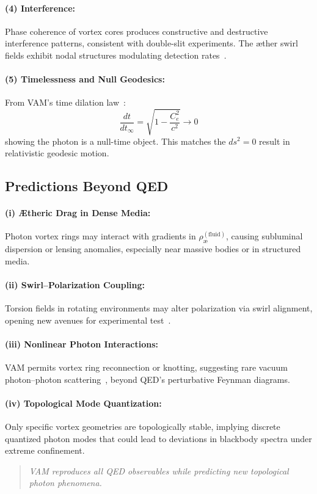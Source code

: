 \paragraph{(4) Interference:}
Phase coherence of vortex cores produces constructive and destructive interference patterns, consistent with double-slit experiments. The æther swirl fields exhibit nodal structures modulating detection rates~\cite{iskandarani2025c}.

\paragraph{(5) Timelessness and Null Geodesics:}
From VAM’s time dilation law~\cite{iskandarani2025b}:
\begin{equation}
    \frac{dt}{dt_\infty} = \sqrt{1 - \frac{C_e^2}{c^2}} \to 0
\end{equation}
showing the photon is a null-time object. This matches the $ds^2 = 0$ result in relativistic geodesic motion.

\subsection{Predictions Beyond QED}

\paragraph{(i) Ætheric Drag in Dense Media:}
Photon vortex rings may interact with gradients in $\rho_\text{\ae}^{(\text{fluid})}$, causing subluminal dispersion or lensing anomalies, especially near massive bodies or in structured media.

\paragraph{(ii) Swirl–Polarization Coupling:}
Torsion fields in rotating environments may alter polarization via swirl alignment, opening new avenues for experimental test~\cite{fedi2023, vanputten2022}.

\paragraph{(iii) Nonlinear Photon Interactions:}
VAM permits vortex ring reconnection or knotting, suggesting rare vacuum photon–photon scattering~\cite{battye1998}, beyond QED’s perturbative Feynman diagrams.

\paragraph{(iv) Topological Mode Quantization:}
Only specific vortex geometries are topologically stable, implying discrete quantized photon modes that could lead to deviations in blackbody spectra under extreme confinement.

\begin{quote}
        \emph{VAM reproduces all QED observables while predicting new topological photon phenomena.}
\end{quote}